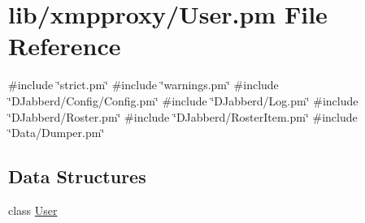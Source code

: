 \hypertarget{_user_8pm}{
\section{lib/xmpproxy/\-User.pm \-File \-Reference}
\label{_user_8pm}
}
{\ttfamily \#include \char`\"{}strict.\-pm\char`\"{}}\*
{\ttfamily \#include \char`\"{}warnings.\-pm\char`\"{}}\*
{\ttfamily \#include \char`\"{}\-D\-Jabberd/\-Config/\-Config.\-pm\char`\"{}}\*
{\ttfamily \#include \char`\"{}\-D\-Jabberd/\-Log.\-pm\char`\"{}}\*
{\ttfamily \#include \char`\"{}\-D\-Jabberd/\-Roster.\-pm\char`\"{}}\*
{\ttfamily \#include \char`\"{}\-D\-Jabberd/\-Roster\-Item.\-pm\char`\"{}}\*
{\ttfamily \#include \char`\"{}\-Data/\-Dumper.\-pm\char`\"{}}\*
\subsection*{\-Data \-Structures}
\begin{DoxyCompactItemize}
\item 
class \hyperlink{classxmpproxy_1_1_user}{\-User}
\end{DoxyCompactItemize}
